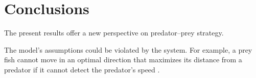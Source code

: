 \documentclass[12pt]{article}
\begin{document}
\section{Conclusions}

The present results offer a new perspective on predator--prey strategy. 


The model's assumptions could be violated by the system. For example, a prey fish cannot move in an optimal direction that maximizes its distance from a predator if it cannot detect the predator's speed \citep{Weihs:1984tb}.

\pagebreak



\end{document}

